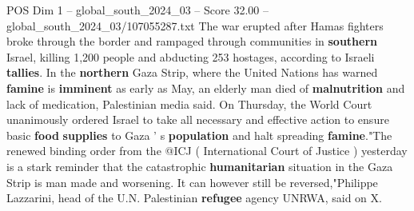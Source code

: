 \begin{textsample}{POS Dim 1 – global\_south\_2024\_03 – Score 32.00 – global\_south\_2024\_03/107055287.txt}
The war erupted after Hamas fighters broke through the border and rampaged through communities in \textbf{southern} Israel, killing 1,200 people and abducting 253 hostages, according to Israeli \textbf{tallies}.
In the \textbf{northern} Gaza Strip, where the United Nations has warned \textbf{famine} is \textbf{imminent} as early as May, an elderly man died of \textbf{malnutrition} and lack of medication, Palestinian media said.
On Thursday, the World Court unanimously ordered Israel to take all necessary and effective action to ensure basic \textbf{food} \textbf{supplies} to Gaza ' s \textbf{population} and halt spreading \textbf{famine}."The renewed binding order from the @ICJ ( International Court of Justice ) yesterday is a stark reminder that the catastrophic \textbf{humanitarian} situation in the Gaza Strip is man made and worsening.
It can however still be reversed,"Philippe Lazzarini, head of the U.N.
Palestinian \textbf{refugee} agency UNRWA, said on X.

\end{textsample}
